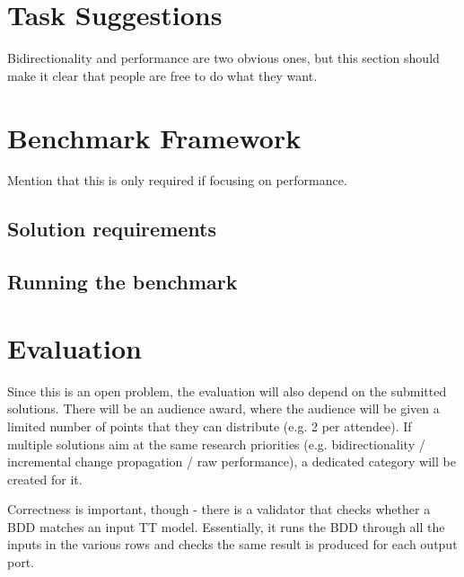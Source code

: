 \documentclass[a4paper]{scrarticle}
\begin{document}
\section{Task Suggestions}

Bidirectionality and performance are two obvious ones, but this section should
make it clear that people are free to do what they want.

\section{Benchmark Framework}

Mention that this is only required if focusing on performance.

\subsection{Solution requirements}

\subsection{Running the benchmark}

\section{Evaluation}

Since this is an open problem, the evaluation will also depend on the submitted
solutions. There will be an audience award, where the audience will be given a
limited number of points that they can distribute (e.g. 2 per attendee). If
multiple solutions aim at the same research priorities (e.g. bidirectionality /
incremental change propagation / raw performance), a dedicated category will be
created for it.

Correctness is important, though - there is a validator that checks whether a
BDD matches an input TT model. Essentially, it runs the BDD through all the
inputs in the various rows and checks the same result is produced for each
output port.
\end{document}
